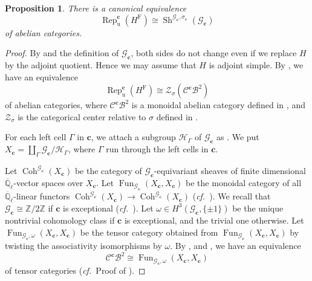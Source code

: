 \documentclass[12pt,a4paper]{article}
\newtheorem{prop}[thm]{Proposition}
\DeclareMathOperator{\Rep}{Rep}
\DeclareMathOperator{\Sh}{Sh}
\DeclareMathOperator{\Coh}{Coh}
\DeclareMathOperator{\Fun}{Fun}
\newcommand{\cf}{\textit{cf.\ }}
\newcommand{\mb}{\mathbb}
\newcommand{\mc}{\mathcal}
\newcommand{\mr}{\mathrm}
\newcommand{\mbf}{\mathbf}
\newcommand{\ol}{\overline}
\begin{document}
\begin{prop}\label{prop:unipcatdec}
There is a canonical equivalence 
	\[
	\Rep_{\mr{u}}^{\mbf{c}}(H^{\mr{F}}) \cong 
	\Sh^{\mc{G}_{\mbf{c}},\sigma_{\mbf{c}}}(\mc{G}_{\mbf{c}})
	\]
	of abelian categories. 
\end{prop}
\begin{proof}
	By \cite[Proposition 11.3.8]{DiMiRepLie2nd} and the definition of $\mc{G}_{\mbf{c}}$, both sides do not change even if we replace $H$ by the adjoint quotient. 
	Hence we may assume that $H$ is adjoint simple. 
	By \cite[6.3 (a)]{LusUnicatcent}, we have an equivalence 
	\[
	\Rep_{\mr{u}}^{\mbf{c}}(H^{\mr{F}}) \cong \mc{Z}_{\sigma}(\mc{C}^{\mbf{c}}\mc{B}^2)
	\]
	of abelian categories, 
	where $\mc{C}^{\mbf{c}}\mc{B}^2$ is a monoidal abelian category defined in 
	\cite[1.6, 6.1]{LusUnicatcent}, 
	and $\mc{Z}_{\sigma}$ is the categorical center relative to $\sigma$ defined in \cite[\S 5.5]{BrViQuanHopf}. 
	
	For each left cell $\Gamma$ in $\mbf{c}$, we attach 
	a subgroup $\mc{H}_{\Gamma}$ of $\mc{G}_{\mbf{c}}$ as \cite[3.8 Proposition]{LusLeadHec}. We put 
	$X_{\mbf{c}}=\coprod_{\Gamma} \mc{G}_{\mbf{c}}/\mc{H}_{\Gamma}$, where $\Gamma$ run through the left cells in $\mbf{c}$. 
	
	Let 
	$\Coh^{\mc{G}_{\mbf{c}}} (X_{\mbf{c}})$ 
	be the category of $\mc{G}_{\mbf{c}}$-equivariant sheaves of finite dimensional $\ol{\mb{Q}}_{\ell}$-vector spaces over $X_{\mbf{c}}$. 
	Let $\Fun _{\mc{G}_{\mbf{c}}} (X_{\mbf{c}},X_{\mbf{c}})$ be the monoidal category of all $\ol{\mb{Q}}_{\ell}$-linear functors 
	$\Coh^{\mc{G}_{\mbf{c}}} (X_{\mbf{c}}) \to \Coh^{\mc{G}_{\mbf{c}}} (X_{\mbf{c}})$ (\cf \cite[5.1]{BeOsTenCellWII}). 
	We recall that $\mc{G}_{\mbf{c}} \cong \mb{Z}/2\mb{Z}$ if $\mbf{c}$ is exceptional (\cf \cite[1]{OstTenExcCellW}). 
	Let $\omega \in H^3 (\mc{G}_{\mbf{c}},\{\pm 1\})$ be the unique nontrivial cohomology class if $\mbf{c}$ is exceptional, and the trivial one otherwise. 
	Let 
	$\Fun_{\mc{G}_{\mbf{c}},\omega} (X_{\mbf{c}} , X_{\mbf{c}})$ be the tensor category obtained from $\Fun_{\mc{G}_{\mbf{c}}} (X_{\mbf{c}}, X_{\mbf{c}})$ 
	by twisting
	the associativity isomorphisms by $\omega$. 
	By \cite[Theorem 4]{BFOTenCellWIII}, \cite[5.1 Remark]{BeOsTenCellWII} and \cite[Remark 2.20]{OstTenExcCellW}, we have an equivalence 
	\begin{equation*}
		\mc{C}^{\mbf{c}}\mc{B}^2 \cong \Fun_{\mc{G}_{\mbf{c}},\omega} (X_{\mbf{c}}, X_{\mbf{c}}) 
	\end{equation*}
	of tensor categories (\cf Proof of \cite[Corollary 5.4]{BFOChDmod}). 
	

\end{proof}
\end{document}
